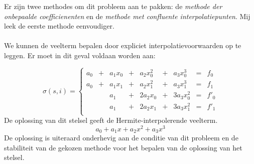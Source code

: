 Er zijn twee methodes om dit probleem aan te pakken: de \textit{methode der onbepaalde coefficienenten} en de \textit{methode met confluente interpolatiepunten}. Mij leek de eerste methode eenvoudiger.\\
\\
We kunnen de veelterm bepalen door expliciet interpolatievoorwaarden op te leggen. Er moet in dit geval voldaan worden aan:

\[
\sigma(s,i) = \left\{
    \begin{array}{ccccccccc}
        a_0 & + & a_1x_0 & + & a_2x_0^2 & + & a_3x_0^3 & = & f_0\\
        a_0 & + & a_1x_1 & + & a_2x_1^2 & + & a_3x_1^3 & = & f_1\\
            &   & a_1    & + & 2a_2x_0 &+& 3a_3x_0^2 & = & f'_0 \\
            &   & a_1    & + & 2a_2x_1 &+& 3a_3x_1^2 & = & f'_1\\
    \end{array}
\right.
\]
De oplossing van dit stelsel geeft de Hermite-interpolerende veelterm.
\[
a_0 + a_1x + a_2x^2 + a_3x^3
\]
De oplossing is uiteraard onderhevig aan de conditie van dit probleem en de stabiliteit van de gekozen methode voor het bepalen van de oplossing van het stelsel.